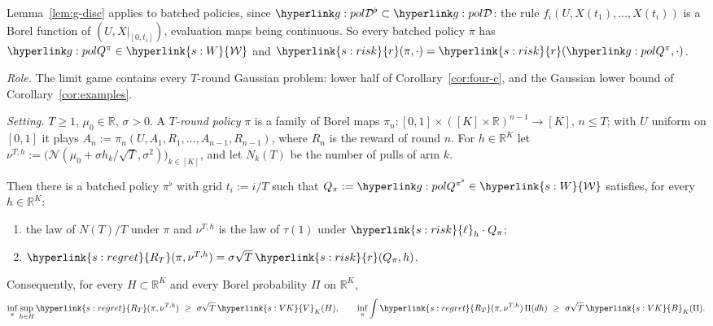 \documentclass[11pt]{article}
\DeclareRobustCommand{\sy}[2]{{\hyperlink{#1}{#2}}}
\newcommand{\R}{\mathbb{R}}
\newcommand{\1}{\mathbf{1}}
\newcommand{\RT}{\sy{s:regret}{R_T}}
\newcommand{\Wc}{\sy{s:W}{\mathcal W}}
\newcommand{\rk}{\sy{s:risk}{r}}
\newcommand{\lh}{\sy{s:risk}{\ell}}
\newcommand{\VK}{\sy{s:VK}{V}}
\newcommand{\BK}{\sy{s:VK}{B}}
\begin{document}
\noindent Lemma~\ref{lem:g-disc} applies to batched policies, since $\gBc\subset\gDc$: the rule $f_i(U,X(t_1),\dots,X(t_i))$ is a Borel function of $(U,X|_{[0,t_i]})$,
evaluation maps being continuous. So every batched policy $\pi$ has $\gQp\pi\in\Wc$ and $\rk(\pi,\cdot)=\rk(\gQp\pi,\cdot)$.

\begin{lemma}\label{lem:embed}
\textit{Role.} The limit game contains every $T$-round Gaussian problem: lower half of Corollary~\ref{cor:four-c}, and the Gaussian lower bound of
Corollary~\ref{cor:examples}.

\noindent\textit{Setting.} $T\ge1$, $\mu_0\in\R$, $\sigma>0$. A \emph{$T$-round policy} $\pi$ is a family of Borel maps $\pi_n:[0,1]\times([K]\times\R)^{n-1}\to[K]$,
$n\le T$; with $U$ uniform on $[0,1]$ it plays $A_n:=\pi_n(U,A_1,R_1,\dots,A_{n-1},R_{n-1})$, where $R_n$ is the reward of round $n$. For $h\in\R^K$ let
$\nu^{T,h}:=\big(\mathcal N(\mu_0+\sigma h_k/\sqrt T,\sigma^2)\big)_{k\in[K]}$, and let $N_k(T)$ be the number of pulls of arm $k$.

\noindent Then there is a batched policy $\pi^\flat$ with grid $t_i:=i/T$ such that $Q_\pi:=\gQp{\pi^\flat}\in\Wc$ satisfies, for every $h\in\R^K$:
\begin{enumerate}
\item[(i)] the law of $N(T)/T$ under $\pi$ and $\nu^{T,h}$ is the law of $\tau(1)$ under $\lh_h\cdot Q_\pi$;
\item[(ii)] $\RT(\pi,\nu^{T,h})=\sigma\sqrt T\,\rk(Q_\pi,h)$.
\end{enumerate}
Consequently, for every $H\subset\R^K$ and every Borel probability $\Pi$ on $\R^K$,
\[
\inf_\pi\sup_{h\in H}\RT(\pi,\nu^{T,h})\ \ge\ \sigma\sqrt T\,\VK_K(H),\qquad \inf_\pi\int\RT(\pi,\nu^{T,h})\,\Pi(dh)\ \ge\ \sigma\sqrt T\,\BK_K(\Pi).
\]
\end{lemma}
\end{document}
